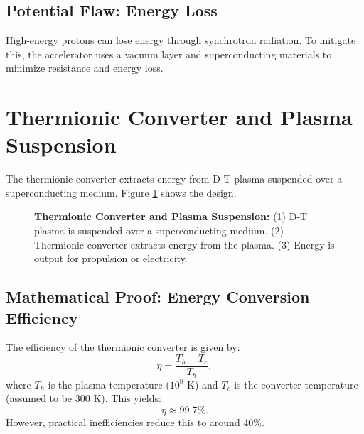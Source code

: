 \documentclass[12pt, a4paper]{article}
\begin{document}
\subsection{Potential Flaw: Energy Loss}
High-energy protons can lose energy through synchrotron radiation. To mitigate this, the accelerator uses a vacuum layer and superconducting materials to minimize resistance and energy loss.

\section{Thermionic Converter and Plasma Suspension}
The thermionic converter extracts energy from D-T plasma suspended over a superconducting medium. Figure \ref{fig:thermionic_converter} shows the design.

\begin{figure}[H]
\centering
{}
\caption{
\textbf{Thermionic Converter and Plasma Suspension:} 
(1) D-T plasma is suspended over a superconducting medium. 
(2) Thermionic converter extracts energy from the plasma. 
(3) Energy is output for propulsion or electricity.
}
\label{fig:thermionic_converter}
\end{figure}

\subsection{Mathematical Proof: Energy Conversion Efficiency}
The efficiency of the thermionic converter is given by:
\[
\eta = \frac{T_h - T_c}{T_h},
\]
where \( T_h \) is the plasma temperature ($10^8$ K) and \( T_c \) is the converter temperature (assumed to be 300 K). This yields:
\[
\eta \approx 99.7\%.
\]
However, practical inefficiencies reduce this to around 40\%.
\end{document}
